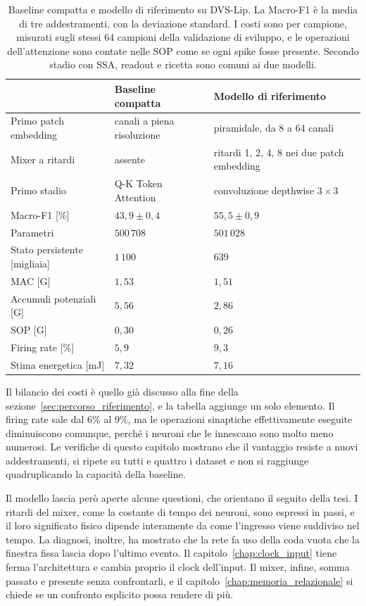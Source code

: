 \begin{table}[t]
\centering
\small
\renewcommand{\arraystretch}{1.2}
\caption[Baseline compatta e modello di riferimento]{Baseline compatta e modello di riferimento su DVS-Lip. La Macro-F1 è la media di tre addestramenti, con la deviazione standard. I costi sono per campione, misurati sugli stessi 64 campioni della validazione di sviluppo, e le operazioni dell'attenzione sono contate nelle SOP come se ogni spike fosse presente. Secondo stadio con SSA, readout e ricetta sono comuni ai due modelli.}
\label{tab:riferimento_sintesi}
\begin{tabularx}{\textwidth}{@{}l >{\raggedright\arraybackslash}X >{\raggedright\arraybackslash}X@{}}
\hline
 & \textbf{Baseline compatta} & \textbf{Modello di riferimento} \\
\hline
Primo patch embedding & 32 canali a piena risoluzione & piramidale, da 8 a 64 canali \\
Mixer a ritardi & assente & ritardi 1, 2, 4, 8 nei due patch embedding \\
Primo stadio & Q-K Token Attention & convoluzione depthwise $3\times3$ \\
\hline
Macro-F1 [\%] & $43{,}9\pm0{,}4$ & $55{,}5\pm0{,}9$ \\
Parametri & $500\,708$ & $501\,028$ \\
Stato persistente [migliaia] & $1\,100$ & $639$ \\
MAC [G] & $1{,}53$ & $1{,}51$ \\
Accumuli potenziali [G] & $5{,}56$ & $2{,}86$ \\
SOP [G] & $0{,}30$ & $0{,}26$ \\
Firing rate [\%] & $5{,}9$ & $9{,}3$ \\
Stima energetica [mJ] & $7{,}32$ & $7{,}16$ \\
\hline
\end{tabularx}
\end{table}

Il bilancio dei costi è quello già discusso alla fine della sezione~\ref{sec:percorso_riferimento}, e la tabella aggiunge un solo elemento. Il firing rate sale dal $6\%$ al $9\%$, ma le operazioni sinaptiche effettivamente eseguite diminuiscono comunque, perché i neuroni che le innescano sono molto meno numerosi. Le verifiche di questo capitolo mostrano che il vantaggio resiste a nuovi addestramenti, si ripete su tutti e quattro i dataset e non si raggiunge quadruplicando la capacità della baseline.

Il modello lascia però aperte alcune questioni, che orientano il seguito della tesi. I ritardi del mixer, come la costante di tempo dei neuroni, sono espressi in passi, e il loro significato fisico dipende interamente da come l'ingresso viene suddiviso nel tempo. La diagnosi, inoltre, ha mostrato che la rete fa uso della coda vuota che la finestra fissa lascia dopo l'ultimo evento. Il capitolo~\ref{chap:clock_input} tiene ferma l'architettura e cambia proprio il clock dell'input. Il mixer, infine, somma passato e presente senza confrontarli, e il capitolo~\ref{chap:memoria_relazionale} si chiede se un confronto esplicito possa rendere di più.
